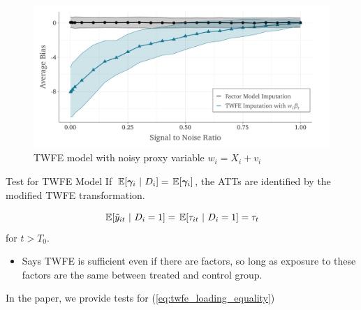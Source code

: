 \documentclass[aspectratio=43,t,11pt]{beamer}
\begin{document}
\begin{frame}{}\label{slide:noisy_xi_simulations}
  \begin{figure}
    \caption{TWFE model with noisy proxy variable $w_i = X_i + v_i$}
    \begin{adjustbox}{width=\textwidth}
      \includegraphics{../figures/simulation-bias_signal_to_noise.pdf}
    \end{adjustbox}
  \end{figure}

\end{frame}


\begin{frame}{Test for TWFE Model}\label{slide:twfe_test}
  If $\expec{\bm \gamma_i}{D_i} = \expec{\bm \gamma_i}$, the ATTs are identified by the modified TWFE transformation.

  \begin{equation}\label{eq:twfe_loading_equality}
    \expec{\tilde{y}_{it}}{D_i = 1} = \expec{\tau_{it}}{D_i = 1} = \tau_t
  \end{equation}
  for $t > T_0$.

  \pause
  \begin{itemize}
    \item Says TWFE is sufficient even if there are factors, so long as exposure to these factors are the same between treated and control group.
  \end{itemize}
  
  \medskip
  In the paper, we provide tests for (\ref{eq:twfe_loading_equality})

\end{frame}
\end{document}
